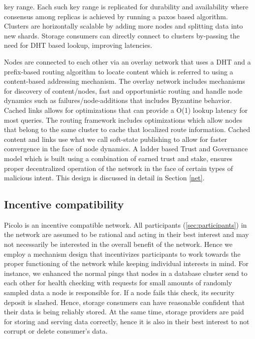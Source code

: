                                                                                                                                                                                                                                                                           {key range}. Each such key range is replicated for durability and availability where consensus among replicas is achieved by running a paxos based algorithm. Clusters are horizontally scalable by adding more nodes and splitting data into new shards. Storage consumers can directly connect to clusters by-passing the need for DHT based lookup, improving latencies.
\newline\newline

Nodes are connected to each other via an overlay network that uses a DHT and a prefix-based routing algorithm to locate
content which is referred to using a content-based addressing mechanism. The overlay network includes mechanisms for discovery of
content/nodes, fast and opportunistic routing and handle node dynamics such as failures/node-additions that includes
Byzantine behavior. Cached links allows for optimizations that can provide a O(1) lookup latency for most queries. The
routing framework includes optimizations which allow nodes that belong to the same cluster to cache that localized
route information. Cached content and links use what we call soft-state publishing to allow for faster convergence in
the face of node dynamics. A ladder based Trust and Governance model which is built using a combination of earned trust
and stake, ensures proper decentralized operation of the network in the face of certain types of malicious intent. This
design is discussed in detail in Section \ref{net}.

\subsection{Incentive compatibility}
\textsf{Picolo} is an incentive compatible network. All participants (\cref{sec:participants}) in the network are assumed to be rational and acting in their best interest and may not necessarily be interested in the overall benefit of the network. Hence we employ a mechanism design that incentivizes participants to work towards the proper functioning of the network while keeping individual interests in mind. For instance, we enhanced the normal pings that nodes in a database cluster send to each other for health checking with requests for small amounts of randomly sampled data a node is responsible for. If a node fails this check, its security deposit is slashed. Hence, storage consumers can have reasonable confident that their data is being reliably stored. At the same time, storage providers are paid for storing and serving data correctly, hence it is also in their best interest to not corrupt or delete consumer's data.

